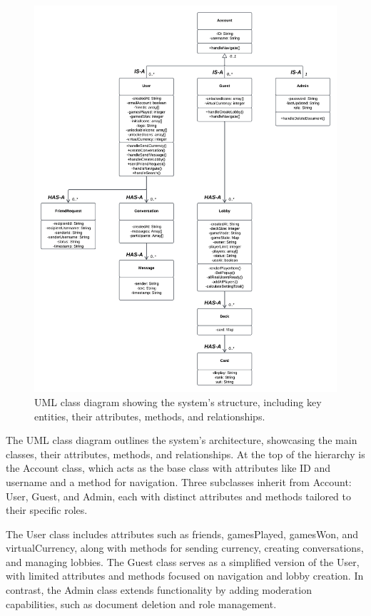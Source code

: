 \begin{figure}[htbp]
    \centering
    \includegraphics[width=1\linewidth]{CS482 Sequence Diagram Sprint 3.png}
    \caption{UML class diagram showing the system's structure, including key entities, their attributes, methods, and relationships.}
    \label{fig:umlclass}
\end{figure}

\noindent The UML class diagram outlines the system's architecture, showcasing the main classes, their attributes, methods, and relationships. At the top of the hierarchy is the Account class, which acts as the base class with attributes like ID and username and a method for navigation. Three subclasses inherit from Account: User, Guest, and Admin, each with distinct attributes and methods tailored to their specific roles.

\noindent The User class includes attributes such as friends, gamesPlayed, gamesWon, and virtualCurrency, along with methods for sending currency, creating conversations, and managing lobbies. The Guest class serves as a simplified version of the User, with limited attributes and methods focused on navigation and lobby creation. In contrast, the Admin class extends functionality by adding moderation capabilities, such as document deletion and role management.

